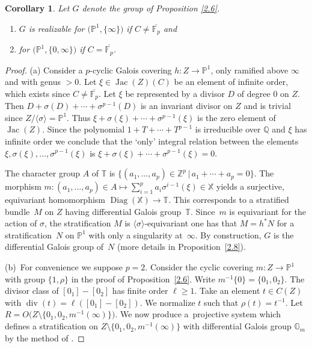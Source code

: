 \documentclass[10pt,a4paper]{amsart}
\numberwithin{equation}{section}
\newtheorem{Corollary}[Theorem]{Corollary}
\begin{document}
\begin{Corollary}\label{2.7} Let $G$ denote the group of Proposition {\rm \ref{2.6}}.
\begin{enumerate}\itemsep=0pt
\item[$(a)$] $G$ is realizable for $\big(\mathbb{P}^1,\{\infty \}\big)$ if $C\neq \overline{\mathbb{F}_p}$ and
\item[$(b)$] for $\big(\mathbb{P}^1,\{0, \infty \}\big)$ if $C=\overline{\mathbb{F}_p}$.
\end{enumerate}
 \end{Corollary}
\begin{proof} (a) Consider a $p$-cyclic Galois covering $h\colon Z\rightarrow \mathbb{P}^1$, only ramified above $\infty$ and with genus $>0$. Let $\xi \in \operatorname{Jac}(Z)(C)$ be an element of infinite
order, which exists since $C\neq \overline{\mathbb{F}_p}$. Let $\xi$ be represented by a divisor
$D$ of degree 0 on $Z$. Then $D+\sigma (D)+\cdots +\sigma^{p-1}(D)$ is an invariant divisor
on $Z$ and is trivial since $Z/\langle \sigma \rangle=\mathbb{P}^1$. Thus
$\xi+\sigma (\xi)+\cdots +\sigma^{p-1}(\xi)$ is the zero element of $\operatorname{Jac}(Z)$.
 Since the polynomial $1+T+\cdots +T^{p-1}$ is irreducible over $\mathbb{Q}$ and $\xi$
 has infinite order we conclude that the `only' integral relation between the elements $\xi, \sigma (\xi),\dots ,\sigma^{p-1}(\xi)$ is $\xi+\sigma (\xi)+\cdots +\sigma^{p-1}(\xi)=0$.

The character group $A$ of $\mathbb{T}$ is $\{(a_1,\dots ,a_p) \in \mathbb{Z}^p\, | \, a_1+\cdots +a_p=0\}$. The morphism $m\colon (a_1,\dots ,a_p)\in A\mapsto \sum\limits_{i=1}^pa_i\sigma^{i-1}(\xi)\in \mathbb{X}$ yields a surjective, equivariant homomorphism $\operatorname{Diag}(\mathbb{X})\allowbreak \rightarrow \mathbb{T}$. This corresponds to a stratified bundle~$M$ on $Z$ having differential Galois group~$\mathbb{T}$. Since~$m$ is equivariant for the action of $\sigma$, the stratification $M$ is $\langle \sigma \rangle$-equivariant one has that $M=h^*N$ for a stratification~$N$ on $\mathbb{P}^1$ with only a singularity at~$\infty$. By construction, $G$ is the differential Galois group of~$N$ (more details in Proposition~\ref{2.8}).

(b)~For convenience we suppose $p=2$. Consider the cyclic covering $m\colon Z\rightarrow \mathbb{P}^1$ with group $\{1,\rho \}$ in the proof of Proposition~\ref{2.6}. Write
 $m^{-1}\{0\}=\{0_1,0_2\}$. The divisor class of $[0_1]-[0_2]$ has finite order $\ell \geq 1$. Take an element $t\in C(Z)$ with $\operatorname{div}(t)=\ell ([0_1]-[0_2])$. We normalize $t$ such that $\rho (t)=t^{-1}$. Let $R=O\big(Z\setminus \big\{0_1,0_2,m^{-1}(\infty )\big\}\big)$. We now produce a~projective system which defines a stratification on $Z\setminus \big\{0_1,0_2,m^{-1}(\infty )\big\}$ with differential Galois group $\mathbb{G}_m$ by the method of \cite[Theorem~7.3, Lemma~7.4]{Ma-vdP1}.


\end{proof}
\end{document}
